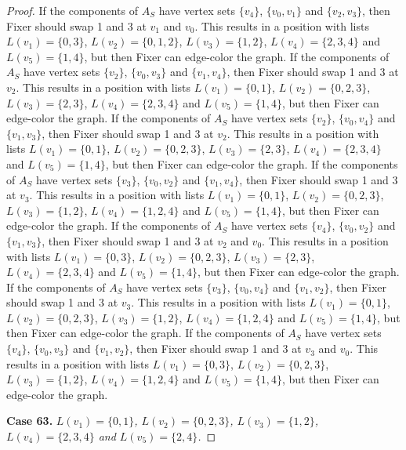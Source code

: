 \documentclass[12pt]{amsart}
\theoremstyle{plain}
\theoremstyle{definition}
\theoremstyle{remark}
\begin{document}
\begin{proof}
If the components of $A_S$ have vertex sets $\{v_4\}$, $\{v_0, v_1\}$ and $\{v_2, v_3\}$, then Fixer should swap 1 and 3 at $v_1$ and $v_0$. This results in a position with lists $L(v_1) = \{0, 3\}$, $L(v_2) = \{0, 1, 2\}$, $L(v_3) = \{1, 2\}$, $L(v_4) = \{2, 3, 4\}$ and $L(v_5) = \{1, 4\}$, but then Fixer can edge-color the graph.
If the components of $A_S$ have vertex sets $\{v_2\}$, $\{v_0, v_3\}$ and $\{v_1, v_4\}$, then Fixer should swap 1 and 3 at $v_2$. This results in a position with lists $L(v_1) = \{0, 1\}$, $L(v_2) = \{0, 2, 3\}$, $L(v_3) = \{2, 3\}$, $L(v_4) = \{2, 3, 4\}$ and $L(v_5) = \{1, 4\}$, but then Fixer can edge-color the graph.
If the components of $A_S$ have vertex sets $\{v_2\}$, $\{v_0, v_4\}$ and $\{v_1, v_3\}$, then Fixer should swap 1 and 3 at $v_2$. This results in a position with lists $L(v_1) = \{0, 1\}$, $L(v_2) = \{0, 2, 3\}$, $L(v_3) = \{2, 3\}$, $L(v_4) = \{2, 3, 4\}$ and $L(v_5) = \{1, 4\}$, but then Fixer can edge-color the graph.
If the components of $A_S$ have vertex sets $\{v_3\}$, $\{v_0, v_2\}$ and $\{v_1, v_4\}$, then Fixer should swap 1 and 3 at $v_3$. This results in a position with lists $L(v_1) = \{0, 1\}$, $L(v_2) = \{0, 2, 3\}$, $L(v_3) = \{1, 2\}$, $L(v_4) = \{1, 2, 4\}$ and $L(v_5) = \{1, 4\}$, but then Fixer can edge-color the graph.
If the components of $A_S$ have vertex sets $\{v_4\}$, $\{v_0, v_2\}$ and $\{v_1, v_3\}$, then Fixer should swap 1 and 3 at $v_2$ and $v_0$. This results in a position with lists $L(v_1) = \{0, 3\}$, $L(v_2) = \{0, 2, 3\}$, $L(v_3) = \{2, 3\}$, $L(v_4) = \{2, 3, 4\}$ and $L(v_5) = \{1, 4\}$, but then Fixer can edge-color the graph.
If the components of $A_S$ have vertex sets $\{v_3\}$, $\{v_0, v_4\}$ and $\{v_1, v_2\}$, then Fixer should swap 1 and 3 at $v_3$. This results in a position with lists $L(v_1) = \{0, 1\}$, $L(v_2) = \{0, 2, 3\}$, $L(v_3) = \{1, 2\}$, $L(v_4) = \{1, 2, 4\}$ and $L(v_5) = \{1, 4\}$, but then Fixer can edge-color the graph.
If the components of $A_S$ have vertex sets $\{v_4\}$, $\{v_0, v_3\}$ and $\{v_1, v_2\}$, then Fixer should swap 1 and 3 at $v_3$ and $v_0$. This results in a position with lists $L(v_1) = \{0, 3\}$, $L(v_2) = \{0, 2, 3\}$, $L(v_3) = \{1, 2\}$, $L(v_4) = \{1, 2, 4\}$ and $L(v_5) = \{1, 4\}$, but then Fixer can edge-color the graph.

\noindent\textbf{Case 63.  }\textit{$L(v_1) = \{0, 1\}$, $L(v_2) = \{0, 2, 3\}$, $L(v_3) = \{1, 2\}$, $L(v_4) = \{2, 3, 4\}$ and $L(v_5) = \{2, 4\}$.}


\end{proof}
\end{document}
